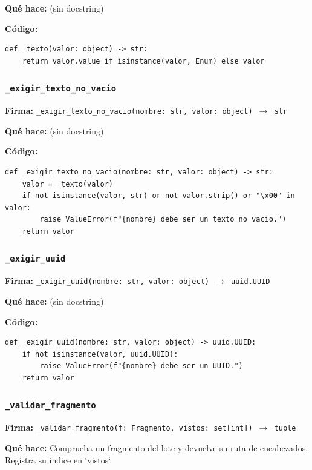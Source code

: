 \documentclass[11pt,a4paper]{article}
\begin{document}
\textbf{Qué hace:} (sin docstring)

\textbf{Código:}
\begin{lstlisting}
def _texto(valor: object) -> str:
    return valor.value if isinstance(valor, Enum) else valor
\end{lstlisting}

\subsubsection*{\texttt{\_exigir\_texto\_no\_vacio}}
\textbf{Firma:} \texttt{\_exigir\_texto\_no\_vacio(nombre: str, valor: object) $\rightarrow$ str}

\textbf{Qué hace:} (sin docstring)

\textbf{Código:}
\begin{lstlisting}
def _exigir_texto_no_vacio(nombre: str, valor: object) -> str:
    valor = _texto(valor)
    if not isinstance(valor, str) or not valor.strip() or "\x00" in valor:
        raise ValueError(f"{nombre} debe ser un texto no vacío.")
    return valor
\end{lstlisting}

\subsubsection*{\texttt{\_exigir\_uuid}}
\textbf{Firma:} \texttt{\_exigir\_uuid(nombre: str, valor: object) $\rightarrow$ uuid.UUID}

\textbf{Qué hace:} (sin docstring)

\textbf{Código:}
\begin{lstlisting}
def _exigir_uuid(nombre: str, valor: object) -> uuid.UUID:
    if not isinstance(valor, uuid.UUID):
        raise ValueError(f"{nombre} debe ser un UUID.")
    return valor
\end{lstlisting}

\subsubsection*{\texttt{\_validar\_fragmento}}
\textbf{Firma:} \texttt{\_validar\_fragmento(f: Fragmento, vistos: set[int]) $\rightarrow$ tuple}

\textbf{Qué hace:} Comprueba un fragmento del lote y devuelve su ruta de encabezados. Registra su índice en `vistos`.
\end{document}

